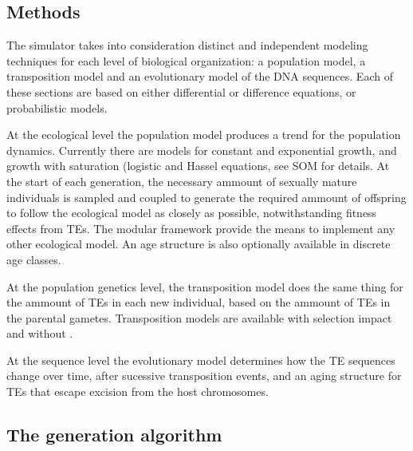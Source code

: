 \documentclass{bioinfo}
\begin{document}
\begin{methods}
\section{Methods}



The simulator takes into consideration distinct and independent
modeling techniques for each level of biological organization: a
population model, a transposition model and an evolutionary model of
the DNA sequences. Each of these sections are based on either
differential or difference equations, or probabilistic models.

At the ecological level the population model produces a trend for the
population dynamics. Currently there are models for constant and
exponential growth, and growth with saturation (logistic and Hassel
equations, see SOM for details. At the start of each generation, the
necessary ammount of sexually mature individuals is sampled and
coupled to generate the required ammount of offspring to follow the
ecological model as closely as possible, notwithstanding fitness
effects from TEs. The modular framework provide the means to implement
any other ecological model. An age structure is also optionally
available in discrete age classes.

At the population genetics level, the transposition model does the
same thing for the ammount of TEs in each new individual, based on the
ammount of TEs in the parental gametes. Transposition models are
available with selection impact \citep{SKR05} and without
\citep{rouzic2005}.

At the sequence level the evolutionary model determines how the TE
sequences change over time, after sucessive transposition events, and
an aging structure for TEs that escape excision from the host
chromosomes.


\subsection{The generation algorithm}


\end{methods}
\end{document}
